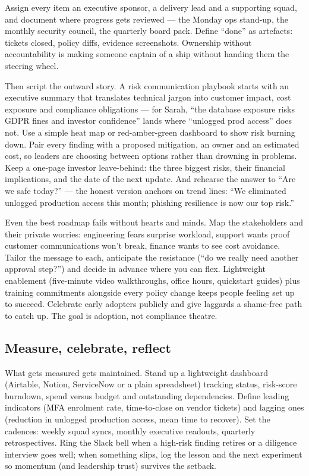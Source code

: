 Assign every item an executive sponsor, a delivery lead and a supporting squad, and document where progress gets reviewed — the Monday ops stand-up, the monthly security council, the quarterly board pack. Define ``done'' as artefacts: tickets closed, policy diffs, evidence screenshots. Ownership without accountability is making someone captain of a ship without handing them the steering wheel.


Then script the outward story. A risk communication playbook starts with an executive summary that translates technical jargon into customer impact, cost exposure and compliance obligations — for Sarah, ``the database exposure risks GDPR fines and investor confidence'' lands where ``unlogged prod access'' does not. Use a simple heat map or red-amber-green dashboard to show risk burning down. Pair every finding with a proposed mitigation, an owner and an estimated cost, so leaders are choosing between options rather than drowning in problems. Keep a one-page investor leave-behind: the three biggest risks, their financial implications, and the date of the next update. And rehearse the answer to ``Are we safe today?'' — the honest version anchors on trend lines: ``We eliminated unlogged production access this month; phishing resilience is now our top risk.''


Even the best roadmap fails without hearts and minds. Map the stakeholders and their private worries: engineering fears surprise workload, support wants proof customer communications won't break, finance wants to see cost avoidance. Tailor the message to each, anticipate the resistance (``do we really need another approval step?'') and decide in advance where you can flex. Lightweight enablement (five-minute video walkthroughs, office hours, quickstart guides) plus training commitments alongside every policy change keeps people feeling set up to succeed. Celebrate early adopters publicly and give laggards a shame-free path to catch up. The goal is adoption, not compliance theatre.



\subsection{Measure, celebrate, reflect}


What gets measured gets maintained. Stand up a lightweight dashboard (Airtable, Notion, ServiceNow or a plain spreadsheet) tracking status, risk-score burndown, spend versus budget and outstanding dependencies. Define leading indicators (MFA enrolment rate, time-to-close on vendor tickets) and lagging ones (reduction in unlogged production access, mean time to recover). Set the cadences: weekly squad syncs, monthly executive readouts, quarterly retrospectives. Ring the Slack bell when a high-risk finding retires or a diligence interview goes well; when something slips, log the lesson and the next experiment so momentum (and leadership trust) survives the setback.


